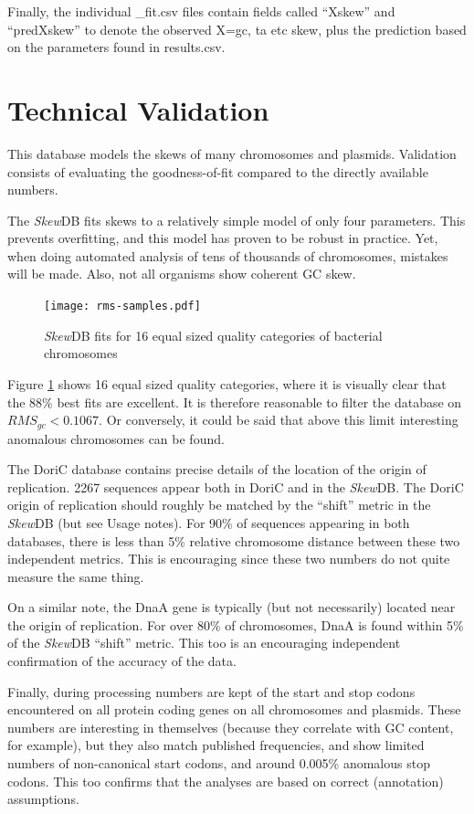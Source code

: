 \documentclass[fleqn,10pt]{wlscirep}
\begin{document}
Finally, the individual \_fit.csv files contain fields called ``Xskew'' and ``predXskew'' to denote the observed X=gc, ta etc skew, plus the prediction based on the parameters found in results.csv. 
\section*{Technical Validation}
This database models the skews of many chromosomes and plasmids. Validation consists of evaluating the goodness-of-fit compared to the directly available numbers.

The \emph{Skew}DB fits skews to a relatively simple model of only four parameters. This prevents overfitting, and this model has proven to be robust in practice. Yet, when doing automated analysis of tens of thousands of chromosomes, mistakes will be made. Also, not all organisms show coherent GC skew.

\begin{figure}[tbhp]
\centering
\texttt{[image: rms-samples.pdf]}
\caption{\emph{Skew}DB fits for 16 equal sized quality categories of bacterial chromosomes}
\label{fig:rms-samples}
\end{figure}

Figure \ref{fig:rms-samples} shows 16 equal sized quality categories, where it is visually clear that the 88\% best fits are excellent. It is therefore reasonable to filter the database on $RMS_{gc}<0.1067$. Or conversely, it could be said that above this limit interesting anomalous chromosomes can be found. 

The DoriC database \cite{luo_doric_2019} contains precise details of the location of the origin of replication. 2267 sequences appear both in DoriC and in the \emph{Skew}DB. The DoriC origin of replication should roughly be matched by the ``shift'' metric in the \emph{Skew}DB (but see Usage notes). For 90\% of sequences appearing in both databases, there is less than 5\% relative chromosome distance between these two independent metrics. This is encouraging since these two numbers do not quite measure the same thing.

On a similar note, the DnaA gene is typically (but not necessarily) located near the origin of replication. For over 80\% of chromosomes, DnaA is found within 5\% of the \emph{Skew}DB ``shift'' metric. This too is an encouraging independent confirmation of the accuracy of the data.

Finally, during processing numbers are kept of the start and stop codons encountered on all protein coding genes on all chromosomes and plasmids. These numbers are interesting in themselves (because they correlate with GC content, for example), but they also match published frequencies, and show limited numbers of non-canonical start codons, and around 0.005\% anomalous stop codons. This too confirms that the analyses are based on correct (annotation) assumptions.
\end{document}
